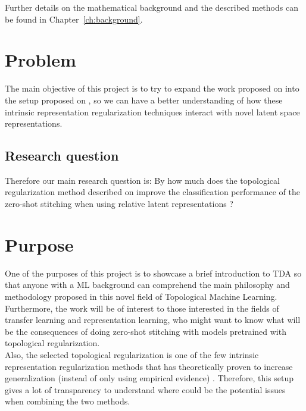 \documentclass[../main.tex]{subfiles}
\begin{document}
Further details on the mathematical background and the described methods can be found in Chapter~\ref{ch:background}.

\section{Problem}
\label{sec:problem}


The main objective of this project is to try to expand the work proposed on \cite{hofer_densified_2021} into the setup proposed on \cite{moschella_relative_2022}, so we can have a better understanding of how these intrinsic representation regularization techniques interact with novel latent space representations.

\subsection{Research question}
\label{sec:researchQuestion}

Therefore our main research question is: By how much does the topological regularization method described on \cite{hofer_densified_2021} improve the classification performance of the zero-shot stitching when using relative latent representations \cite{moschella_relative_2022}?

\section{Purpose}

One of the purposes of this project is to showcase a brief introduction to TDA so that anyone with a ML background can comprehend the main philosophy and methodology proposed in this novel field of Topological Machine Learning. Furthermore, the work will be of interest to those interested in the fields of transfer learning and representation learning, who might want to know what will be the consequences of doing zero-shot stitching with models pretrained with topological regularization.\\

Also, the selected topological regularization is one of the few intrinsic representation regularization methods that has theoretically proven to increase generalization (instead of only using empirical evidence) \cite{hofer_densified_2021}. Therefore, this setup gives a lot of transparency to understand where could be the potential issues when combining the two methods.
\end{document}
